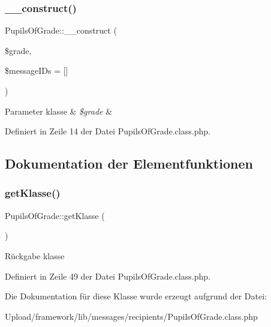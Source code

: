 \subsubsection{\texorpdfstring{\+\_\+\+\_\+construct()}{\_\_construct()}}
{\footnotesize\ttfamily Pupils\+Of\+Grade\+::\+\_\+\+\_\+construct (\begin{DoxyParamCaption}\item[{}]{\$grade,  }\item[{}]{\$message\+I\+Ds = {\ttfamily \mbox{[}\mbox{]}} }\end{DoxyParamCaption})}


\begin{DoxyParams}[1]{Parameter}
klasse & {\em \$grade} & \\
\hline
\end{DoxyParams}


Definiert in Zeile 14 der Datei Pupils\+Of\+Grade.\+class.\+php.



\subsection{Dokumentation der Elementfunktionen}
\mbox{\label{class_pupils_of_grade_a83f529436017451f580617d71ee696f6}} 
\subsubsection{\texorpdfstring{get\+Klasse()}{getKlasse()}}
{\footnotesize\ttfamily Pupils\+Of\+Grade\+::get\+Klasse (\begin{DoxyParamCaption}{ }\end{DoxyParamCaption})}

\begin{DoxyReturn}{Rückgabe}
klasse 
\end{DoxyReturn}


Definiert in Zeile 49 der Datei Pupils\+Of\+Grade.\+class.\+php.



Die Dokumentation für diese Klasse wurde erzeugt aufgrund der Datei\+:\begin{DoxyCompactItemize}
\item 
Upload/framework/lib/messages/recipients/Pupils\+Of\+Grade.\+class.\+php\end{DoxyCompactItemize}
